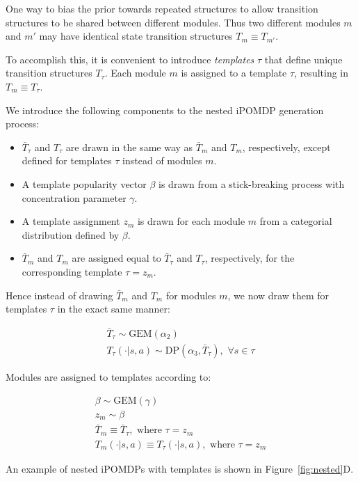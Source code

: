 \documentclass[11pt]{article}
\begin{document}
One way to bias the prior towards repeated structures to allow transition structures to be shared between different modules. Thus two different modules $m$ and $m'$ may have identical state transition structures $T_m \equiv T_{m'}$.

To accomplish this, it is convenient to introduce \textit{templates} $\tau$ that define unique transition structures $T_{\tau}$. Each module $m$ is assigned to a template $\tau$, resulting in $T_m \equiv T_\tau$. 

We introduce the following components to the nested iPOMDP generation process:

\begin{itemize}
\item $\bar{T}_\tau$ and $T_\tau$ are drawn in the same way as $\bar{T}_m$ and $T_m$, respectively, except defined for templates $\tau$ instead of modules $m$.
\item A template popularity vector $\beta$ is drawn from a stick-breaking process with concentration parameter $\gamma$.
\item A template assignment $z_m$ is drawn for each module $m$ from a categorial distribution defined by $\beta$.
\item $\bar{T}_m$ and $T_m$ are assigned equal to $\bar{T}_\tau$ and $T_\tau$, respectively, for the corresponding template $\tau = z_m$.
\end{itemize}

Hence instead of drawing $\bar{T}_m$ and $T_m$ for modules $m$, we now draw them for templates $\tau$ in the exact same manner:

\begin{align*}
\bar{T}_{\tau} \sim \text{GEM}(\alpha_2)  \\
T_\tau(\cdot|s,a) \sim \text{DP}(\alpha_3, \bar{T}_\tau) ,\,\,\forall s \in \tau
\end{align*}

Modules are assigned to templates according to:

\begin{align*}
\beta \sim \text{GEM}(\gamma) \\
z_m \sim \beta \\
\bar{T}_{m} \equiv \bar{T}_{\tau},  \text{ where } \tau = z_m \\
T_m(\cdot|s,a) \equiv T_\tau(\cdot | s,a), \text{ where } \tau = z_m 
\end{align*}

An example of nested iPOMDPs with templates is shown in Figure~\ref{fig:nested}D.
\end{document}
